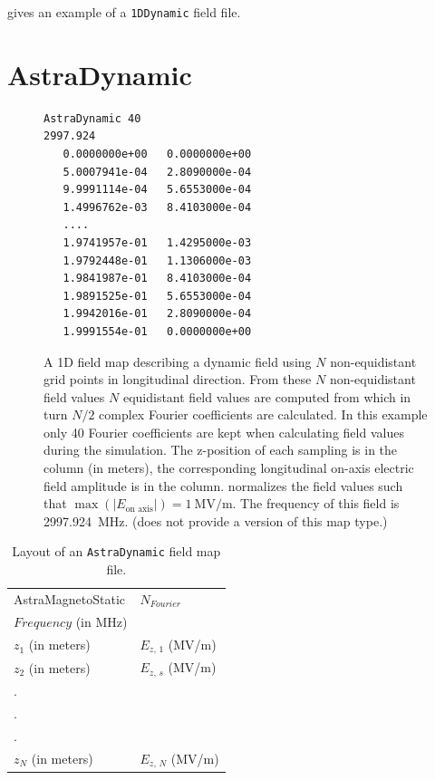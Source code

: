  gives an example of a \texttt{1DDynamic} field file.


\section{AstraDynamic}
\label{sec:AstraDynamic}
\begin{figure}[h]
\begin{fmpage}
\begin{verbatim}
AstraDynamic 40
2997.924
   0.0000000e+00   0.0000000e+00
   5.0007941e-04   2.8090000e-04
   9.9991114e-04   5.6553000e-04
   1.4996762e-03   8.4103000e-04
   ....
   1.9741957e-01   1.4295000e-03
   1.9792448e-01   1.1306000e-03
   1.9841987e-01   8.4103000e-04
   1.9891525e-01   5.6553000e-04
   1.9942016e-01   2.8090000e-04
   1.9991554e-01   0.0000000e+00
\end{verbatim}
\end{fmpage}
\caption[Example of an ASTRA compatible dynamic field map]{A 1D field map describing a dynamic field using $N$
  non-equidistant grid points in longitudinal direction. From these $N$ non-equidistant field values $N$ equidistant
  field values are computed from which in turn $N/2$ complex Fourier coefficients are calculated. In this example
  only 40 Fourier coefficients are kept when calculating field values during the simulation. The z-position of each
  sampling is in the  column (in meters), the corresponding longitudinal on-axis electric field amplitude
  is in the  column. \opalt normalizes the field values such that $\max(|E_{\text{on axis}}|) = \SI{1}{\mega\volt/\meter}$.
  The frequency of this field is \SI{2997.924}{\mega\hertz}. (\opalt does not provide a  version of this map type.)
}
\label{fig:AstraDynamic}
\end{figure}

\begin{table}[ht!]
    \caption{Layout of an \texttt{AstraDynamic} field map file.}
    \label{tab:AstraDynamic}
    \begin{center}
    \begin{tabular}{ll}
      \hline
      AstraMagnetoStatic & $N_{Fourier}$ \\
      $Frequency$ (in MHz) & \\
      $z_{1}$ (in meters) & $E_{z,\,1}$ (MV/m) \\
      $z_{2}$ (in meters) & $E_{z,\,s}$ (MV/m) \\
      . & \\
      . & \\
      . & \\
      $z_{N}$ (in meters) & $E_{z,\,N}$ (MV/m) \\
      \hline
    \end{tabular}
    \end{center}
\end{table}

